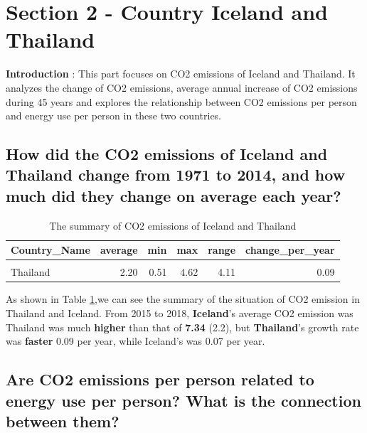 \documentclass[11pt,a4paper,]{article}
\begin{document}
\clearpage

\hypertarget{section-2---country-iceland-and-thailand}{%
\section{Section 2 - Country Iceland and Thailand}\label{section-2---country-iceland-and-thailand}}

\textbf{Introduction} :
This part focuses on CO2 emissions of Iceland and Thailand. It analyzes the change of CO2 emissions, average annual increase of CO2 emissions during 45 years and explores the relationship between CO2 emissions per person and energy use per person in these two countries.

\hypertarget{how-did-the-co2-emissions-of-iceland-and-thailand-change-from-1971-to-2014-and-how-much-did-they-change-on-average-each-year}{%
\subsection{How did the CO2 emissions of Iceland and Thailand change from 1971 to 2014, and how much did they change on average each year?}\label{how-did-the-co2-emissions-of-iceland-and-thailand-change-from-1971-to-2014-and-how-much-did-they-change-on-average-each-year}}

\begin{table}[!h]

\caption{\label{tab:co2table}The summary of CO2 emissions of Iceland and Thailand}
\centering
\begin{tabular}[t]{lrrrrr}
\toprule
Country\_Name & average & min & max & range & change\_per\_year\\
\midrule
\cellcolor{gray!6}{Iceland} & \cellcolor{gray!6}{7.34} & \cellcolor{gray!6}{5.61} & \cellcolor{gray!6}{8.80} & \cellcolor{gray!6}{3.19} & \cellcolor{gray!6}{0.07}\\
Thailand & 2.20 & 0.51 & 4.62 & 4.11 & 0.09\\
\bottomrule
\end{tabular}
\end{table}

As shown in Table \ref{tab:co2table},we can see the summary of the situation of CO2 emission in Thailand and Iceland. From 2015 to 2018, \textbf{Iceland}'s average CO2 emission was Thailand was much \textbf{higher} than that of \textbf{7.34} (2.2), but \textbf{Thailand}'s growth rate was \textbf{faster} 0.09 per year, while Iceland's was 0.07 per year.

\hypertarget{are-co2-emissions-per-person-related-to-energy-use-per-person-what-is-the-connection-between-them}{%
\subsection{Are CO2 emissions per person related to energy use per person? What is the connection between them?}\label{are-co2-emissions-per-person-related-to-energy-use-per-person-what-is-the-connection-between-them}}
\end{document}
